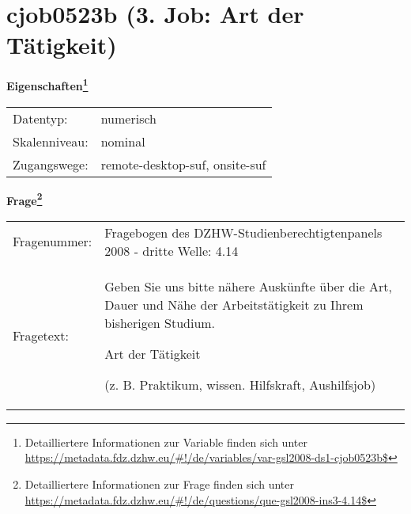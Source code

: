 
    \setcounter{footnote}{0}

    \vspace*{-1.8cm}
	\section{cjob0523b (3. Job: Art der Tätigkeit)}
	\label{section:cjob0523b}



    \vspace*{0.5cm}
    \noindent\textbf{Eigenschaften\footnote{Detailliertere Informationen zur Variable finden sich unter
		\url{https://metadata.fdz.dzhw.eu/\#!/de/variables/var-gsl2008-ds1-cjob0523b$}}}\\
	\begin{tabularx}{\hsize}{@{}lX}
	Datentyp: & numerisch \\
	Skalenniveau: & nominal \\
	Zugangswege: &
	  remote-desktop-suf, 
	  onsite-suf
 \\
    \end{tabularx}



				\vspace*{0.5cm}
                \noindent\textbf{Frage\footnote{Detailliertere Informationen zur Frage finden sich unter
		              \url{https://metadata.fdz.dzhw.eu/\#!/de/questions/que-gsl2008-ins3-4.14$}}}\\
				\begin{tabularx}{\hsize}{@{}lX}
					Fragenummer: &
					  Fragebogen des DZHW-Studienberechtigtenpanels 2008 - dritte Welle:
					  4.14
 \\
					Fragetext: & Geben Sie uns bitte nähere Auskünfte über die Art, Dauer und Nähe der Arbeitstätigkeit zu Ihrem bisherigen Studium.\par  Art der Tätigkeit\par  (z. B. Praktikum, wissen. Hilfskraft, Aushilfsjob) \\
				\end{tabularx}





